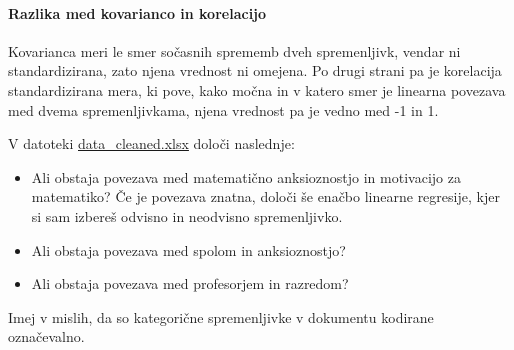 \paragraph{Razlika med kovarianco in korelacijo}

Kovarianca meri le smer sočasnih sprememb dveh spremenljivk, vendar ni standardizirana, zato njena vrednost ni omejena. Po drugi strani pa je korelacija standardizirana mera, ki pove, kako močna in v katero smer je linearna povezava med dvema spremenljivkama, njena vrednost pa je vedno med -1 in 1.

\begin{Vaje}{1}
    V datoteki \href{https://github.com/borbregant/ai_tandem_learning/blob/main/data_cleaned.xlsx}{data\_cleaned.xlsx} določi naslednje:
    \begin{itemize}
        \item Ali obstaja povezava med matematično anksioznostjo in motivacijo za matematiko? Če je povezava znatna, določi še enačbo linearne regresije, kjer si sam izbereš odvisno in neodvisno spremenljivko.
        \item Ali obstaja povezava med spolom in anksioznostjo?
        \item Ali obstaja povezava med profesorjem in razredom?
    \end{itemize}
    Imej v mislih, da so kategorične spremenljivke v dokumentu kodirane označevalno.
\end{Vaje}
